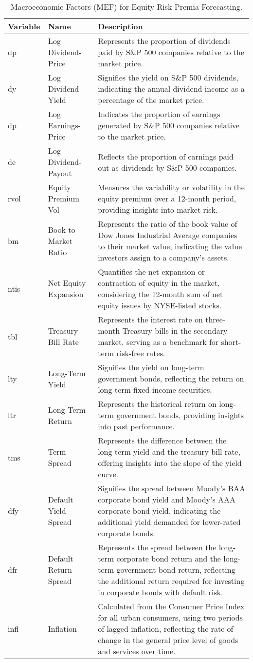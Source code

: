\documentclass{article}
\begin{document}
\begin{table}[H]
\centering
\begin{tabular}{|l|l|p{7.5cm}|}
\hline
\textbf{Variable} & \textbf{Name} & \textbf{Description} \\
\hline
dp & Log Dividend-Price & Represents the proportion of dividends paid by S\&P 500 companies relative to the market price. \\
dy & Log Dividend Yield & Signifies the yield on S\&P 500 dividends, indicating the annual dividend income as a percentage of the market price. \\
dp & Log Earnings-Price & Indicates the proportion of earnings generated by S\&P 500 companies relative to the market price. \\
de & Log Dividend-Payout & Reflects the proportion of earnings paid out as dividends by S\&P 500 companies. \\
rvol & Equity Premium Vol & Measures the variability or volatility in the equity premium over a 12-month period, providing insights into market risk. \\
bm & Book-to-Market Ratio & Represents the ratio of the book value of Dow Jones Industrial Average companies to their market value, indicating the value investors assign to a company's assets. \\
ntis & Net Equity Expansion & Quantifies the net expansion or contraction of equity in the market, considering the 12-month sum of net equity issues by NYSE-listed stocks. \\
tbl & Treasury Bill Rate & Represents the interest rate on three-month Treasury bills in the secondary market, serving as a benchmark for short-term risk-free rates. \\
lty & Long-Term Yield & Signifies the yield on long-term government bonds, reflecting the return on long-term fixed-income securities. \\
ltr & Long-Term Return & Represents the historical return on long-term government bonds, providing insights into past performance. \\
tms & Term Spread & Represents the difference between the long-term yield and the treasury bill rate, offering insights into the slope of the yield curve. \\
dfy & Default Yield Spread & Signifies the spread between Moody's BAA corporate bond yield and Moody's AAA corporate bond yield, indicating the additional yield demanded for lower-rated corporate bonds. \\
dfr & Default Return Spread & Represents the spread between the long-term corporate bond return and the long-term government bond return, reflecting the additional return required for investing in corporate bonds with default risk. \\
infl & Inflation & Calculated from the Consumer Price Index for all urban consumers, using two periods of lagged inflation, reflecting the rate of change in the general price level of goods and services over time. \\
\hline
\end{tabular}
\caption{Macroeconomic Factors (MEF) for Equity Risk Premia Forecasting.}
\label{tab:MEF}
\end{table}
\end{document}

